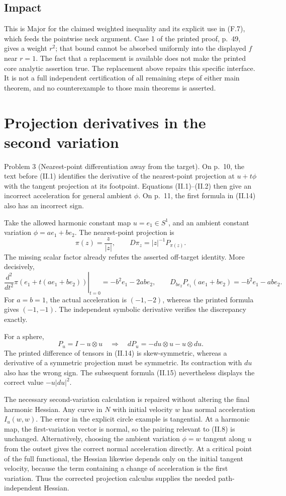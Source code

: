 \documentclass[10pt]{article}
\begin{document}
\subsection*{Impact}
This is Major for the claimed weighted inequality and its explicit use in (F.7), which feeds the pointwise neck argument. Case 1 of the printed proof, p. 49, gives a weight \(r^2\); that bound cannot be absorbed uniformly into the displayed \(f\) near \(r=1\). The fact that a replacement is available does not make the printed core analytic assertion true. The replacement above repairs this specific interface. It is not a full independent certification of all remaining steps of either main theorem, and no counterexample to those main theorems is asserted.\par
\section*{Projection derivatives in the second variation}
Problem 3 (Nearest-point differentiation away from the target).  On p. 10, the text before (II.1) identifies the derivative of the nearest-point projection at \(u+t\phi\) with the tangent projection at its footpoint. Equations (II.1)–(II.2) then give an incorrect acceleration for general ambient \(\phi\). On p. 11, the first formula in (II.14) also has an incorrect sign.\par
Take the allowed harmonic constant map \(u=e_1\in S^1\), and an ambient constant variation \(\phi=ae_1+be_2\). The nearest-point projection is \[\pi(z)=\frac z{|z|},\qquad
 D\pi_z=|z|^{-1}P_{\pi(z)}.\] The missing scalar factor already refutes the asserted off-target identity. More decisively, \[\left.\frac{d^2}{dt^2}\pi(e_1+t(ae_1+be_2))\right|_{t=0}
 =-b^2e_1-2ab e_2,
 \qquad
 D_{be_2}P_{e_1}(ae_1+be_2)=-b^2e_1-ab e_2.\] For \(a=b=1\), the actual acceleration is \((-1,-2)\), whereas the printed formula gives \((-1,-1)\). The independent symbolic derivative verifies the discrepancy exactly.\par
For a sphere, \[P_u=I-u\otimes u
 \quad\Longrightarrow\quad
 dP_u=-du\otimes u-u\otimes du.\] The printed difference of tensors in (II.14) is skew-symmetric, whereas a derivative of a symmetric projection must be symmetric. Its contraction with \(du\) also has the wrong sign. The subsequent formula (II.15) nevertheless displays the correct value \(-u|du|^2\).\par
The necessary second-variation calculation is repaired without altering the final harmonic Hessian. Any curve in \(N\) with initial velocity \(w\) has normal acceleration \(I_u(w,w)\). The error in the explicit circle example is tangential. At a harmonic map, the first-variation vector is normal, so the pairing relevant to (II.8) is unchanged. Alternatively, choosing the ambient variation \(\phi=w\) tangent along \(u\) from the outset gives the correct normal acceleration directly. At a critical point of the full functional, the Hessian likewise depends only on the initial tangent velocity, because the term containing a change of acceleration is the first variation. Thus the corrected projection calculus supplies the needed path-independent Hessian.\par
\end{document}

